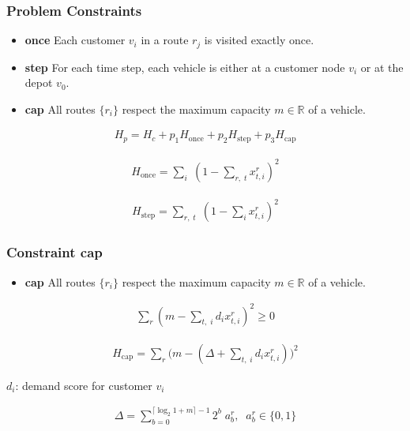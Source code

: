 \documentclass {beamer}
\begin{document}
\begin {frame}
\frametitle {Problem Constraints}

\begin {itemize}
\pause
\item[\textbf{once}] Each customer $v_i$ in a route $r_j$ is visited exactly
	once.
\pause
\item[\textbf{step}] For each time step, each vehicle is either at a customer
	node $v_i$ or at the depot $v_0$.
\pause
\item[\textbf{cap}] All routes $\{r_i\}$ respect the maximum capacity
	$m \in \mathbb R$ of a vehicle.
\end {itemize}

\pause
\begin {align*}
H_p = H_c + p_1 H_{\text{once}} + p_2 H_{\text{step}} + p_3 H_{\text{cap}}
\end {align*}

\pause
\begin {align*}
H_{\text{once}} = \sum_i \; (1 - \sum_{r, \; t} x_{t, i}^r)^2
\end {align*}

\pause
\begin {align*}
H_{\text{step}} = \sum_{r, \; t} \; (1 - \sum_i x_{t, i}^r)^2
\end {align*}

\end {frame}

\begin {frame}
\frametitle {Constraint \textbf{cap}}

\begin {itemize}
\item[\textbf{cap}] All routes $\{r_i\}$ respect the maximum capacity
	$m \in \mathbb R$ of a vehicle.
\end {itemize}

\centering
\pause
\begin {align*}
\sum_r (m - \sum_{t, \; i} d_i x_{t, i}^r)^2 \ge 0
\end {align*}

\pause
\begin {align*}
H_{\text{cap}} = \sum_r \big( m - (\Delta + \sum_{t, \; i} d_i x_{t, i}^r) \big) ^2
\end {align*}

\pause
$d_i$: demand score for customer $v_i$

\pause
\begin {align*}
\Delta = \sum_{b = 0}^{\lceil \log_2 1+m \rceil - 1} 2^b \; a_b^r,
\; \; a_b^r \in \{0, 1\}
\end {align*}

\end {frame}
\end{document}
